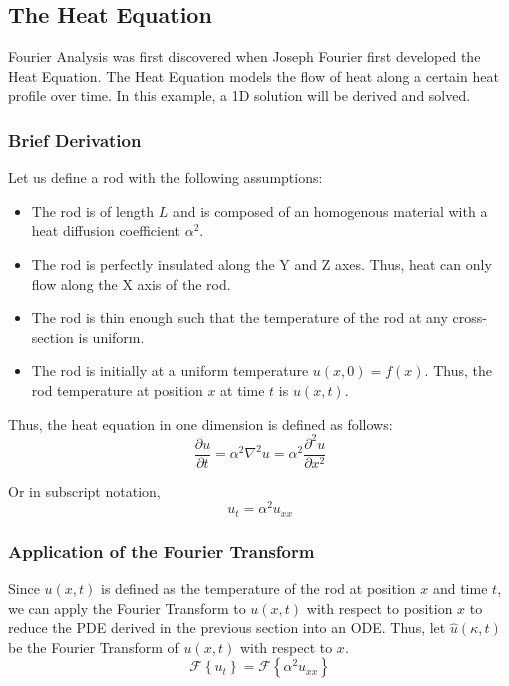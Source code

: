 \subsection{The Heat Equation}
Fourier Analysis was first discovered when Joseph Fourier first developed the Heat Equation. The Heat Equation models the flow of heat along a certain heat profile over time. In this example, a 1D solution will be derived and solved.

\subsubsection{Brief Derivation}
\noindent
Let us define a rod with the following assumptions:
\begin{itemize}
    \item The rod is of length \(L\) and is composed of an homogenous material with a heat diffusion coefficient \( \alpha^2 \).
    \item The rod is perfectly insulated along the Y and Z axes. Thus, heat can only flow along the X axis of the rod.
    \item The rod is thin enough such that the temperature of the rod at any cross-section is uniform.
    \item The rod is initially at a uniform temperature \(u(x,0) = f(x)\). Thus, the rod temperature at position \(x\) at time \(t\) is \(u(x,t)\).
\end{itemize}


\noindent
Thus, the heat equation in one dimension is defined as follows:
\begin{equation} \label{eq:heat_equation}
    \frac{\partial u}{\partial t} = \alpha^2 \nabla^2 u = \alpha^2 \frac{\partial^2 u}{\partial x^2}
\end{equation}

\noindent
Or in subscript notation,
\begin{equation} \label{eq:heat_equation_subscript}
    u_t = \alpha^2 u_{xx}
\end{equation}

\subsubsection{Application of the Fourier Transform}
Since \(u(x,t)\) is defined as the temperature of the rod at position \(x\) and time \(t\), we can apply the Fourier Transform to \(u(x,t)\) with respect to position \(x\) to reduce the PDE derived in the previous section into an ODE. Thus, let \(\hat{u}(\kappa,t)\) be the Fourier Transform of \(u(x,t)\) with respect to \(x\).
\begin{equation}
    \mathcal{F} \left\{ u_t \right\} = \mathcal{F} \left\{ \alpha^2 u_{xx} \right\}
\end{equation}

